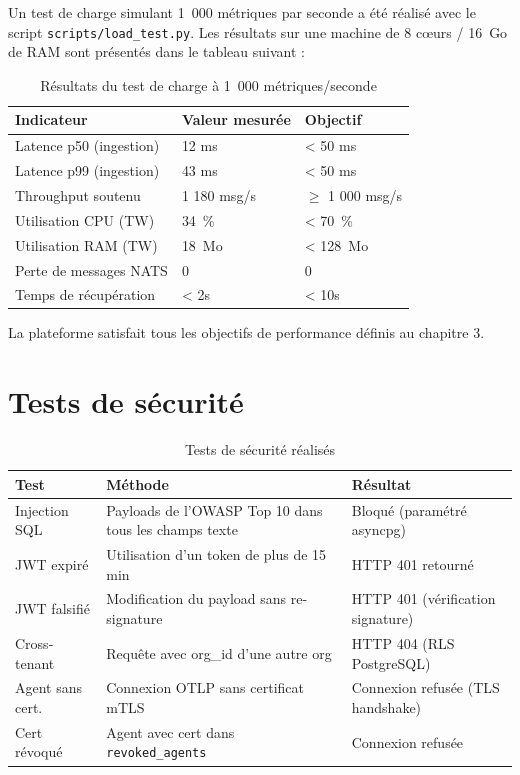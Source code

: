 Un test de charge simulant 1~000 métriques par seconde a été réalisé avec le
script \texttt{scripts/load\_test.py}. Les résultats sur une machine de 8 cœurs /
16~Go de RAM sont présentés dans le tableau suivant :

\begin{table}[H]
\centering
\caption{Résultats du test de charge à 1~000 métriques/seconde}
\label{tab:load-test}
\begin{tabularx}{\textwidth}{lXX}
\toprule
\textbf{Indicateur} & \textbf{Valeur mesurée} & \textbf{Objectif} \\
\midrule
Latence p50 (ingestion) & 12 ms  & < 50 ms \\
Latence p99 (ingestion) & 43 ms  & < 50 ms \\
Throughput soutenu      & 1 180 msg/s & $\geq$ 1 000 msg/s \\
Utilisation CPU (TW)    & 34~\%  & < 70~\% \\
Utilisation RAM (TW)    & 18~Mo  & < 128~Mo \\
Perte de messages NATS  & 0      & 0 \\
Temps de récupération   & < 2s   & < 10s \\
\bottomrule
\end{tabularx}
\end{table}

La plateforme satisfait tous les objectifs de performance définis au chapitre 3.

\section{Tests de sécurité}

\begin{table}[H]
\centering
\caption{Tests de sécurité réalisés}
\label{tab:security-tests}
\small
\begin{tabularx}{\textwidth}{lXl}
\toprule
\textbf{Test} & \textbf{Méthode} & \textbf{Résultat} \\
\midrule
Injection SQL     & Payloads de l'OWASP Top 10 dans tous les champs texte
                  & Bloqué (paramétré asyncpg) \\
JWT expiré        & Utilisation d'un token de plus de 15 min
                  & HTTP 401 retourné \\
JWT falsifié      & Modification du payload sans re-signature
                  & HTTP 401 (vérification signature) \\
Cross-tenant      & Requête avec org\_id d'une autre org
                  & HTTP 404 (RLS PostgreSQL) \\
Agent sans cert.  & Connexion OTLP sans certificat mTLS
                  & Connexion refusée (TLS handshake) \\
Cert révoqué      & Agent avec cert dans \texttt{revoked\_agents}
                  & Connexion refusée \\
\bottomrule
\end{tabularx}
\end{table}

